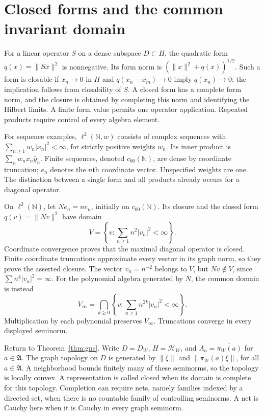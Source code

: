 \section{Closed forms and the common invariant domain}
\label{sec:graph-domain}

For a linear operator $S$ on a dense subspace $D\subset H$, the quadratic
form $q(x)=\|Sx\|^2$ is nonnegative.  Its form norm is
$(\|x\|^2+q(x))^{1/2}$.  Such a form is closable if $x_n\to0$ in $H$ and
$q(x_n-x_m)\to0$ imply $q(x_n)\to0$; the implication follows from
closability of $S$.  A closed form has a complete form norm, and the closure
is obtained by completing this norm and identifying the Hilbert limits.
A finite form value permits one operator application.  Repeated products
require control of every algebra element.

For sequence examples, $\ell^2(\mathbb N,w)$ consists of complex sequences
with $\sum_{n\geq1}w_n|x_n|^2<\infty$, for strictly positive weights $w_n$.
Its inner product is $\sum_n w_nx_n\bar y_n$.  Finite sequences, denoted
$c_{00}(\mathbb N)$, are dense by coordinate truncation; $e_n$ denotes the
$n$th coordinate vector.  Unspecified weights are one.
The distinction between a single form and all products already occurs for
a diagonal operator.

\begin{example}
\label{ex:maximal-domain}
On $\ell^2(\mathbb N)$, let $Ne_n=ne_n$, initially on $c_{00}(\mathbb N)$.
Its closure and the closed form $q(v)=\|Nv\|^2$ have domain
\[
 V=\left\{v:\sum_{n\geq1}n^2|v_n|^2<\infty\right\}.
\]
Coordinate convergence proves that the maximal diagonal operator is closed.
Finite coordinate truncations approximate every vector in its graph norm,
so they prove the asserted closure.  The vector $v_n=n^{-2}$ belongs to $V$,
but $Nv\notin V$, since $\sum n^4|v_n|^2=\infty$.
For the polynomial algebra generated by $N$, the common domain is instead
\begin{equation}
 V_\infty=\bigcap_{k\geq0}
 \left\{v:\sum_{n\geq1}n^{2k}|v_n|^2<\infty\right\}.
 \label{eq:all-moments}
\end{equation}
Multiplication by each polynomial preserves $V_\infty$.
Truncations converge in every displayed seminorm.
\end{example}

Return to Theorem~\ref{thm:gns}.  Write $D=D_W$, $H=\mathcal H_W$,
and $A_a=\overline{\pi_W(a)}$ for $a\in\mathfrak A$.
The graph topology on $D$ is generated by $\|\xi\|$ and
$\|\pi_W(a)\xi\|$, for all $a\in\mathfrak A$.
A neighborhood bounds finitely many of these seminorms, so the topology
is locally convex.  A representation is called closed when its domain is
complete for this topology.  Completion can require nets, namely families
indexed by a directed set, when there is no countable family of controlling
seminorms.  A net is Cauchy here when it is Cauchy in every graph seminorm.

